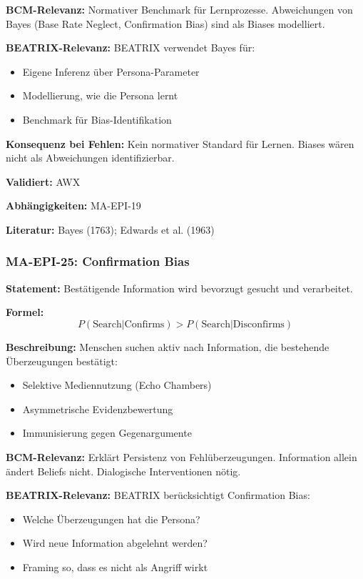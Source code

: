 \textbf{BCM-Relevanz:}
Normativer Benchmark für Lernprozesse. Abweichungen von Bayes (Base Rate Neglect, Confirmation Bias) sind als Biases modelliert.

\textbf{BEATRIX-Relevanz:}
BEATRIX verwendet Bayes für:
\begin{itemize}
    \item Eigene Inferenz über Persona-Parameter
    \item Modellierung, wie die Persona lernt
    \item Benchmark für Bias-Identifikation
\end{itemize}

\textbf{Konsequenz bei Fehlen:}
Kein normativer Standard für Lernen. Biases wären nicht als Abweichungen identifizierbar.

\textbf{Validiert:} AWX

\textbf{Abhängigkeiten:} MA-EPI-19

\textbf{Literatur:} Bayes (1763); Edwards et al. (1963)


\subsubsection*{MA-EPI-25: Confirmation Bias}

\textbf{Statement:} Bestätigende Information wird bevorzugt gesucht und verarbeitet.

\textbf{Formel:}
\begin{equation}
P(\text{Search}|\text{Confirms}) > P(\text{Search}|\text{Disconfirms})
\end{equation}

\textbf{Beschreibung:}
Menschen suchen aktiv nach Information, die bestehende Überzeugungen bestätigt:
\begin{itemize}
    \item Selektive Mediennutzung (Echo Chambers)
    \item Asymmetrische Evidenzbewertung
    \item Immunisierung gegen Gegenargumente
\end{itemize}

\textbf{BCM-Relevanz:}
Erklärt Persistenz von Fehlüberzeugungen. Information allein ändert Beliefs nicht. Dialogische Interventionen nötig.

\textbf{BEATRIX-Relevanz:}
BEATRIX berücksichtigt Confirmation Bias:
\begin{itemize}
    \item Welche Überzeugungen hat die Persona?
    \item Wird neue Information abgelehnt werden?
    \item Framing so, dass es nicht als Angriff wirkt
\end{itemize}

